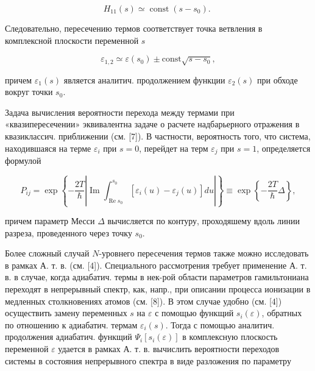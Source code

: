\documentclass[10pt]{article}
\begin{document}
\[

H_{11}(s) \simeq \operatorname{const}\left(s-s_{0}\right) \text {. }

\]



Следовательно, пересечению термов соответствует точка ветвления в комплексной плоскости переменной $s$



\[

\varepsilon_{1,2} \simeq \varepsilon\left(s_{0}\right) \pm \mathrm{const} \sqrt{s-s_{0}},

\]



причем $\varepsilon_{1}(s)$ является аналитич. продолжением функции $\varepsilon_{2}(s)$ при обходе вокруг точки $s_{0}$.



Задача вычисления вероятности перехода между термами при «квазипересечении» эквивалентна задаче о расчете надбарьерного отражения в квазиклассич. приближении (см. [7]). В частности, вероятность того, что система, находившаяся на терме $\varepsilon_{i}$ при $s=0$, перейдет на терм $\varepsilon_{j}$ при $s=1$, определяется формулой



\[

P_{i j}=\exp \left\{-\frac{2 T}{\hbar}\left|\operatorname{Im} \int_{\operatorname{Re} s_{0}}^{s_{0}}\left[\varepsilon_{i}(u)-\varepsilon_{j}(u)\right] d u\right|\right\} \equiv \exp \left\{-\frac{2 T}{\hbar} \Delta\right\},

\]



причем параметр Месси $\Delta$ вычисляется по контуру, проходяшему вдоль линии разреза, проведенного через точку $s_{0}$.



Более сложный случай $N$-уровнего пересечения термов также можно исследовать в рамках А. т. в. (см. [4]). Специального рассмотрения требует применение А. т. в. в случае, когда адиабатич. термы в нек-рой области параметров гамильтониана переходят в непрерывный спектр, как, напр., при описании процесса ионизации в медленных столкновениях атомов (см. [8]). В этом случае удобно (см. [4]) осуществить замену переменных $s$ на $\varepsilon$ с помощью функщий $s_{i}(\varepsilon)$, обратных по отношению к адиабатич. термам $\varepsilon_{i}(s)$. Тогда с помощью аналитич. продолжения адиабатич. функщий $\Psi_{i}\left[s_{i}(\varepsilon)\right]$ в комплексную плоскость переменной $\varepsilon$ удается в рамках А. т. в. вычислить вероятности переходов системы в состояния непрерывного спектра в виде разложения по параметру
\end{document}
